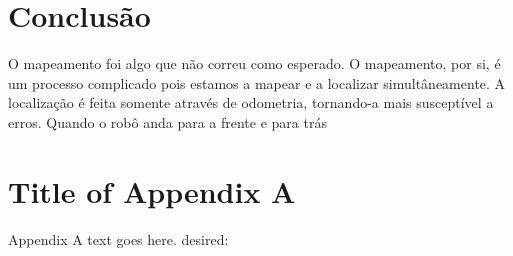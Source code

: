 \documentclass[journal]{IEEEtran}
\begin{document}
\section{Conclusão}

O mapeamento foi algo que não correu como esperado. O mapeamento, por si, é um processo complicado pois estamos a mapear e a localizar simultâneamente. A localização é feita somente através de odometria, tornando-a mais susceptível a erros. Quando o robô anda para a frente e para trás


\appendices
\section{Title of Appendix A}
Appendix A text goes here.
desired:

\end{document}
